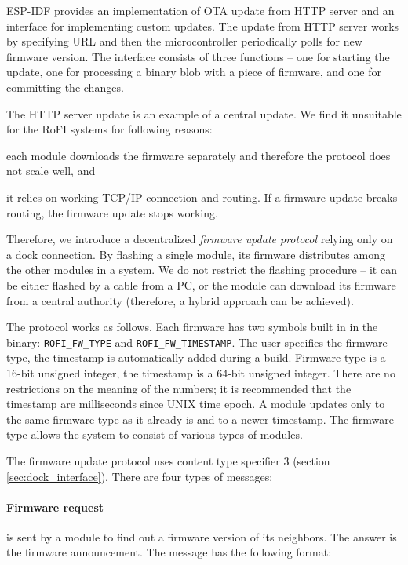 ESP-IDF provides an implementation of OTA update from HTTP server and an
interface for implementing custom updates. The update from HTTP server works by
specifying URL and then the microcontroller periodically polls for new firmware
version. The interface consists of three functions -- one for starting the
update, one for processing a binary blob with a piece of firmware, and one for
committing the changes.

The HTTP server update is an example of a central update. We find it unsuitable
for the RoFI systems for following reasons:
\begin{enumerate*}
    \item each module downloads the firmware separately and therefore the
    protocol does not scale well, and
    \item it relies on working TCP/IP connection and routing. If a firmware
    update breaks routing, the firmware update stops working.
\end{enumerate*}
Therefore, we introduce a decentralized \emph{firmware update protocol} relying
only on a dock connection. By flashing a single module, its firmware distributes
among the other modules in a system. We do not restrict the flashing procedure
-- it can be either flashed by a cable from a PC, or the module can download its
firmware from a central authority (therefore, a hybrid approach can be
achieved).

The protocol works as follows. Each firmware has two symbols built in in the
binary: \texttt{ROFI\_FW\_TYPE} and \texttt{ROFI\_FW\_TIMESTAMP}. The user
specifies the firmware type, the timestamp is automatically added during a
build. Firmware type is a 16-bit unsigned integer, the timestamp is a 64-bit
unsigned integer. There are no restrictions on the meaning of the numbers; it is
recommended that the timestamp are milliseconds since UNIX time epoch. A module
updates only to the same firmware type as it already is and to a newer
timestamp. The firmware type allows the system to consist of various types of
modules.

The firmware update protocol uses content type specifier 3 (section
\ref{sec:dock_interface}). There are four types of messages:

\paragraph{Firmware request} is sent by a module to find out a firmware version
of its neighbors. The answer is the firmware announcement. The message has the
following format:

